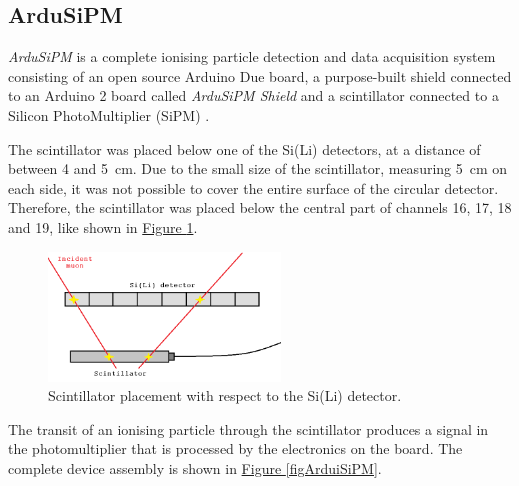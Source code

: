 
\subsection{ArduSiPM}
\label{secArduSiPM}
\textit{ArduSiPM} is a complete ionising particle detection and data acquisition system consisting of an open source Arduino Due board, a purpose-built shield connected to an Arduino 2 board called \textit{ArduSiPM Shield} and a scintillator connected to a Silicon PhotoMultiplier (SiPM) \cite{bocci_2015_particle}. 

\par
The scintillator was placed below one of the Si(Li) detectors, at a distance of between 4 and \SI{5}{\cm}. Due to the small size of the scintillator, measuring \SI{5}{\cm} on each side, it was not possible to cover the entire surface of the circular detector. Therefore, the scintillator was placed below the central part of channels 16, 17, 18 and 19, like shown in \hyperref[figScintillatorSiLi]{Figure \ref{figScintillatorSiLi}}.

\begin{figure}[h!]
    \centering
    \includegraphics[width=0.55\textwidth]{Images/chap3/scintillator_sensor_detail.png}
    \caption{Scintillator placement with respect to the Si(Li) detector.}
    \label{figScintillatorSiLi}
\end{figure}

\par
The transit of an ionising particle through the scintillator produces a signal in the photomultiplier that is processed by the electronics on the board. The complete device assembly is shown in \hyperref[figArduiSiPM]{Figure \ref{figArduiSiPM}}.

